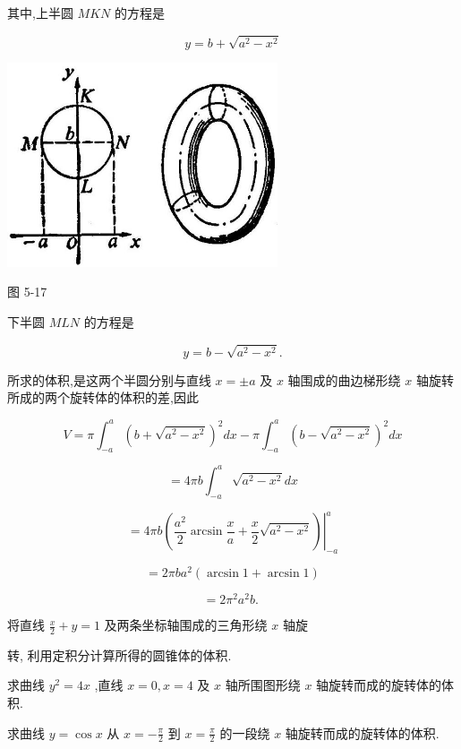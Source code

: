 \documentclass[lang=cn,newtx,10pt,scheme=chinese]{elegantbook}
\begin{document}
其中,上半圆 \({MKN}\) 的方程是

\[
y = b + \sqrt{{a}^{2} - {x}^{2}}
\]

\begin{center}
\includegraphics[max width=0.6\textwidth]{images/01912c18-5c3f-733d-b775-749ba9897a9d_239_464014.jpg}
\end{center}

图 5-17

下半圆 \({MLN}\) 的方程是

\[
y = b - \sqrt{{a}^{2} - {x}^{2}}.
\]

所求的体积,是这两个半圆分别与直线 \(x = \pm a\) 及 \(x\) 轴围成的曲边梯形绕 \(x\) 轴旋转所成的两个旋转体的体积的差,因此

\[
V = \pi {\int }_{-a}^{a}{\left( b + \sqrt{{a}^{2} - {x}^{2}}\right) }^{2}{dx} - \pi {\int }_{-a}^{a}{\left( b - \sqrt{{a}^{2} - {x}^{2}}\right) }^{2}{dx}
\]

\[
= {4\pi b}{\int }_{-a}^{a}\sqrt{{a}^{2} - {x}^{2}}{dx}
\]

\[
= {\left. 4\pi b\left( \frac{{a}^{2}}{2}\arcsin \frac{x}{a} + \frac{x}{2}\sqrt{{a}^{2} - {x}^{2}}\right) \right| }_{-a}^{a}
\]

\[
= {2\pi b}{a}^{2}\left( {\arcsin 1 + \arcsin 1}\right)
\]

\[
= 2{\pi }^{2}{a}^{2}b\text{. }
\]

\begin{problemset}[练习]

\item 将直线 \(\frac{x}{2} + y = 1\) 及两条坐标轴围成的三角形绕 \(x\) 轴旋

转, 利用定积分计算所得的圆锥体的体积.

\item 求曲线 \({y}^{2} = {4x}\) ,直线 \(x = 0,x = 4\) 及 \(x\) 轴所围图形绕 \(x\) 轴旋转而成的旋转体的体积.

\item 求曲线 \(y = \cos x\) 从 \(x = - \frac{\pi }{2}\) 到 \(x = \frac{\pi }{2}\) 的一段绕 \(x\) 轴旋转而成的旋转体的体积.

\end{problemset}
\end{document}
